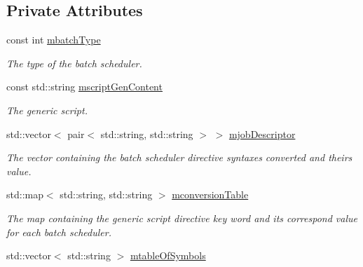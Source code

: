 \subsection*{Private Attributes}
\begin{DoxyCompactItemize}
\item 
\hypertarget{classScriptGenConvertor_a5b172ac6cd19034e663f583316354a92}{
const int \hyperlink{classScriptGenConvertor_a5b172ac6cd19034e663f583316354a92}{mbatchType}}
\label{classScriptGenConvertor_a5b172ac6cd19034e663f583316354a92}

\begin{DoxyCompactList}\small\item\em The type of the batch scheduler. \item\end{DoxyCompactList}\item 
\hypertarget{classScriptGenConvertor_aa991805a04d857ee01cacad20834bde8}{
const std::string \hyperlink{classScriptGenConvertor_aa991805a04d857ee01cacad20834bde8}{mscriptGenContent}}
\label{classScriptGenConvertor_aa991805a04d857ee01cacad20834bde8}

\begin{DoxyCompactList}\small\item\em The generic script. \item\end{DoxyCompactList}\item 
\hypertarget{classScriptGenConvertor_aaa03e9e80e98f8baf8774a8a5f99b338}{
std::vector$<$ pair$<$ std::string, std::string $>$ $>$ \hyperlink{classScriptGenConvertor_aaa03e9e80e98f8baf8774a8a5f99b338}{mjobDescriptor}}
\label{classScriptGenConvertor_aaa03e9e80e98f8baf8774a8a5f99b338}

\begin{DoxyCompactList}\small\item\em The vector containing the batch scheduler directive syntaxes converted and theirs value. \item\end{DoxyCompactList}\item 
\hypertarget{classScriptGenConvertor_abcb4cef424940a8ffefe5fc56605b2a9}{
std::map$<$ std::string, std::string $>$ \hyperlink{classScriptGenConvertor_abcb4cef424940a8ffefe5fc56605b2a9}{mconversionTable}}
\label{classScriptGenConvertor_abcb4cef424940a8ffefe5fc56605b2a9}

\begin{DoxyCompactList}\small\item\em The map containing the generic script directive key word and its correspond value for each batch scheduler. \item\end{DoxyCompactList}\item 
\hypertarget{classScriptGenConvertor_a9678ded89d16c1d739e45991c663e6ad}{
std::vector$<$ std::string $>$ \hyperlink{classScriptGenConvertor_a9678ded89d16c1d739e45991c663e6ad}{mtableOfSymbols}}
\label{classScriptGenConvertor_a9678ded89d16c1d739e45991c663e6ad}


\end{DoxyCompactItemize}
